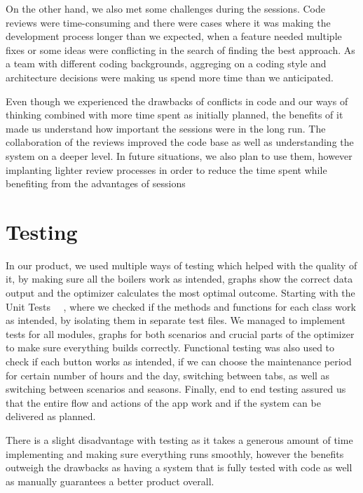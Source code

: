 On the other hand, we also met some challenges during the sessions. Code reviews were time-consuming and there were cases where it was making the development process longer than we expected, when a feature needed multiple fixes or some ideas were conflicting in the search of finding the best approach. As a team with different coding backgrounds, aggreging on a coding style and architecture decisions were making us spend more time than we anticipated.
	
Even though we experienced the drawbacks of conflicts in code and our ways of thinking combined with more time spent as initially planned, the benefits of it made us understand how important the sessions were in the long run. The collaboration of the reviews improved the code base as well as understanding the system on a deeper level. In future situations, we also plan to use them, however implanting lighter review processes in order to reduce the time spent while benefiting from the advantages of sessions



\section{Testing}

In our product, we used multiple ways of testing which helped with the quality of it, by making sure all the boilers work as intended, graphs show the correct data output and the optimizer calculates the most optimal outcome. Starting with the Unit Tests ~\cite{xunit}~\cite{testsdk}, where we checked if the methods and functions for each class work as intended, by isolating them in separate test files. We managed to implement tests for all modules, graphs for both scenarios and crucial parts of the optimizer to make sure everything builds correctly. Functional testing was also used to check if each button works as intended, if we can choose the maintenance period for certain number of hours and the day, switching between tabs, as well as switching between scenarios and seasons. Finally, end to end testing assured us that the entire flow and actions of the app work and if the system can be delivered as planned.
	
There is a slight disadvantage with testing as it takes a generous amount of time implementing and making sure everything runs smoothly, however the benefits outweigh the drawbacks as having a system that is fully tested with code as well as manually guarantees a better product overall.

